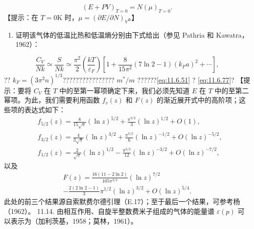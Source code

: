 \begin{equation}\tag{11.6.104}\label{eq:11.6.104}
( E + P V ) _ { T = 0 } = N ( \mu ) _ { T = 0 } .
\end{equation}
【提示：在 \(T=0\)K 时，\(\mu = (\partial E/\partial N)_{V}\)。】
\begin{enumerate}
\def\labelenumi{(\alph{enumi})}
\setcounter{enumi}{2}
\item
  证明该气体的低温比热和低温熵分别由下式给出（参见 Pathria 和 Kawatra，1962）：
\end{enumerate}
\begin{equation}\tag{11.6.105}\label{eq:11.6.105}
\frac { C _ { V } } { N k } \simeq \frac { S } { N k } \simeq \frac { \pi ^{2} } { 2 } \left( \frac { k T } { \varepsilon _ { F } } \right) \left[ 1 + \frac { 8 } { 15 \pi ^{2} } ( 7 \ln 2 - 1 ) ( k _ { F } a ) ^{2} + \cdots \right] ,
\end{equation}
?? \(k_{F}=(3\pi^{2}n)^{1/3}\)???????????????? \(m^{*}/m\) ??????\autoref{eq:11.6.51} ? \autoref{eq:11.6.77}?
【提示：要将 \(C_V\) 在 \(T\) 中的至第一幂项确定下来，我们必须先知道 \(E\) 在 \(T\) 中的至第二幂项。为此，我们需要利用函数 \(f_v(z)\) 和 \(F(z)\) 的渐近展开式中的高阶项；这些项的表达式如下：
\begin{equation}\tag{11.6.106}\label{eq:11.6.106}
\begin{array}{rl} & { f _ { 5 / 2 } ( z ) = \frac { 8 } { 15 \sqrt { \pi } } ( \ln z ) ^{5 / 2} + \frac { \pi ^{3 / 2} } { 3 } ( \ln z ) ^{1 / 2} + O ( 1 ) , } \\& { f _ { 3 / 2 } ( z ) = \frac { 4 } { 3 \sqrt { \pi } } ( \ln z ) ^{3 / 2} + \frac { \pi ^{3 / 2} } { 6 } ( \ln z ) ^{- 1 / 2} + O ( \ln z ) ^{- 5 / 2} , } \\& { f _ { 1 / 2 } ( z ) = \frac { 2 } { \sqrt { \pi } } ( \ln z ) ^{1 / 2} - \frac { \pi ^{3 / 2} } { 12 } ( \ln z ) ^{- 3 / 2} + O ( \ln z ) ^{- 7 / 2} , } \end{array}
\end{equation}
以及
\begin{equation}\tag{11.6.107}\label{eq:11.6.107}
\begin{array}{r} { F ( z ) = \frac { 16 ( 11 - 2 \ln 2 ) } { 10 5 \pi ^{3 / 2} } ( \ln z ) ^{7 / 2} } \\{ - \frac { 2 ( 2 \ln 2 - 1 ) } { 3 } \pi ^{1 / 2} ( \ln z ) ^{3 / 2} + O ( \ln z ) ^{5 / 4} . } \end{array}
\end{equation}
此处的前三个结果源自索默费尔德引理（E.17）；至于最后一个结果，可参考杨（1962）。
11.14. 由相互作用、自旋半整数费米子组成的气体的能量谱 \(\varepsilon(p)\) 可以表示为（加利茨基，1958；莫林，1961）。

